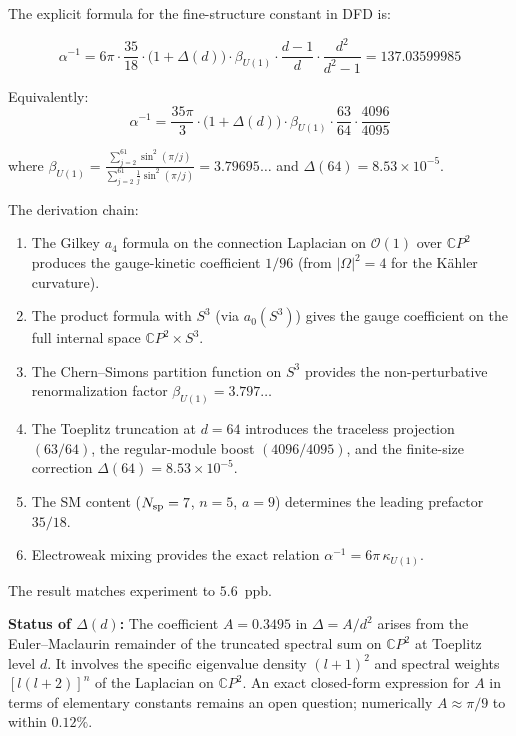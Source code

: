 \documentclass[12pt,a4paper]{article}
\theoremstyle{definition}
\begin{document}
The explicit formula for the fine-structure constant in DFD is:

\begin{tcolorbox}[colback=green!5!white, colframe=green!50!black,
  title=\textbf{The Complete $\alpha$ Formula}]
\begin{equation}
\alpha^{-1} = 6\pi\cdot\frac{35}{18}\cdot
\bigl(1 + \Delta(d)\bigr)\cdot\beta_{U(1)}\cdot
\frac{d-1}{d}\cdot\frac{d^2}{d^2-1}
= 137.03599985
\end{equation}

\medskip\noindent
Equivalently:
\begin{equation}
\alpha^{-1} = \frac{35\pi}{3}\cdot
\bigl(1 + \Delta(d)\bigr)\cdot\beta_{U(1)}\cdot
\frac{63}{64}\cdot\frac{4096}{4095}
\end{equation}

\medskip\noindent
where $\beta_{U(1)} = \displaystyle\frac{\sum_{j=2}^{61}\sin^2(\pi/j)}
{\sum_{j=2}^{61}\frac{1}{j}\sin^2(\pi/j)} = 3.79695\ldots$
and $\Delta(64) = 8.53 \times 10^{-5}$.
\end{tcolorbox}

\medskip

The derivation chain:
\begin{enumerate}
\item The Gilkey $a_4$ formula on the connection Laplacian on $\mathcal{O}(1)$
  over $\mathbb{C}P^2$ produces the gauge-kinetic coefficient $1/96$
  (from $|\Omega|^2 = 4$ for the K\"ahler curvature).

\item The product formula with $S^3$ (via $a_0(S^3)$) gives the gauge
  coefficient on the full internal space $\mathbb{C}P^2 \times S^3$.

\item The Chern--Simons partition function on $S^3$ provides the
  non-perturbative renormalization factor $\beta_{U(1)} = 3.797\ldots$

\item The Toeplitz truncation at $d = 64$ introduces the traceless
  projection $(63/64)$, the regular-module boost $(4096/4095)$, and
  the finite-size correction $\Delta(64) = 8.53 \times 10^{-5}$.

\item The SM content ($N_{\rm sp} = 7$, $n = 5$, $a = 9$) determines
  the leading prefactor $35/18$.

\item Electroweak mixing provides the exact relation
  $\alpha^{-1} = 6\pi\,\kappa_{U(1)}$.
\end{enumerate}

The result matches experiment to $5.6$~ppb.

\bigskip
\noindent\textbf{Status of $\Delta(d)$:}
The coefficient $A = 0.3495$ in $\Delta = A/d^2$ arises from the
Euler--Maclaurin remainder of the truncated spectral sum on
$\mathbb{C}P^2$ at Toeplitz level $d$.  It involves the specific
eigenvalue density $(l+1)^2$ and spectral weights $[l(l+2)]^n$
of the Laplacian on $\mathbb{C}P^2$.  An exact closed-form expression
for $A$ in terms of elementary constants remains an open question;
numerically $A \approx \pi/9$ to within $0.12\%$.
\end{document}
